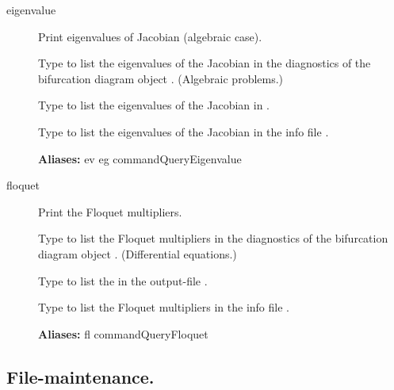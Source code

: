 \documentclass[12pt]{report}
\begin{document}
\begin{description}
\item[eigenvalue]
Print eigenvalues of Jacobian (algebraic case).

    Type  to list the eigenvalues of the Jacobian 
    in the diagnostics of the bifurcation diagram object .
    (Algebraic problems.)

    Type  to list the eigenvalues of the Jacobian 
    in . 

    Type  to list the eigenvalues of the Jacobian 
    in the info file .
    
\textbf{Aliases:} ev eg commandQueryEigenvalue

\item[floquet]
Print the Floquet multipliers.

    Type  to list the Floquet multipliers
    in the diagnostics of the bifurcation diagram object .
    (Differential equations.)

    Type  to list the 
    in the output-file . 

    Type  to list the Floquet multipliers 
    in the info file .
    
\textbf{Aliases:} fl commandQueryFloquet
\end{description}

\subsection{File-maintenance.}
\end{document}
